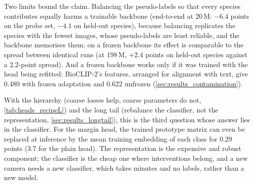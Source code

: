 Two limits bound the claim.
Balancing the pseudo-labels so that every species contributes equally harms a trainable backbone (end-to-end at 20\,M: $-6.4$ points on the probe set, $-4.1$ on held-out species), because balancing replicates the species with the fewest images, whose pseudo-labels are least reliable, and the backbone memorises them; on a frozen backbone its effect is comparable to the spread between identical runs (at 198\,M, $+2.4$ points on held-out species against a 2.2-point spread).
And a frozen backbone works only if it was trained with the head being refitted: BioCLIP-2's features, arranged for alignment with text, give 0.480 with frozen adaptation and 0.622 unfrozen (\cref{sec:results_contamination}).

With the hierarchy (coarse losses help, coarse parameters do not, \cref{tab:heads_recipeL}) and the long tail (rebalance the classifier, not the representation, \cref{sec:results_longtail}), this is the third question whose answer lies in the classifier.
For the margin head, the trained prototype matrix can even be replaced at inference by the mean training embedding of each class for 0.29 points (3.7 for the plain head).
The representation is the expensive and robust component; the classifier is the cheap one where interventions belong, and a new camera needs a new classifier, which takes minutes and no labels, rather than a new model.
